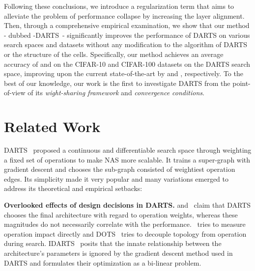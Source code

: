 \documentclass{article} \usepackage{fancyhdr, iclr2023_conference, times}
\newcommand{\mydarts}{-DARTS\xspace}
\newcommand{\lambdafn}{layer alignment\xspace}
\begin{document}
\par Following these conclusions, we introduce a regularization term that aims to alleviate the problem of performance collapse by increasing the \lambdafn. 
Then, through a comprehensive empirical examination, we show that our method - dubbed \mydarts~- significantly improves the performance of DARTS on various search spaces and datasets without any modification to the algorithm of DARTS or the structure of the cells. Specifically, our method achieves an average accuracy of  and  on the CIFAR-10 and CIFAR-100 datasets on the DARTS search space, improving upon the current state-of-the-art by  and , respectively. To the best of our knowledge, our work is the first to investigate DARTS from the point-of-view of its \textit{wight-sharing framework} and \textit{convergence conditions}.


\section{Related Work}
DARTS~\citep{DBLP:conf/iclr/LiuSY19} proposed a continuous and differentiable search space through weighting a fixed set of operations to make NAS more scalable. It trains a super-graph with gradient descent and chooses the sub-graph consisted of weightiest operation edges. Its simplicity made it very popular and many variations emerged to address its theoretical and empirical setbacks:

\textbf{Overlooked effects of design decisions in DARTS.}
\citep{DBLP:conf/iclr/WangCCTH21} and~\citep{DBLP:conf/cvpr/GuW0YWLC21} claim that DARTS chooses the final architecture with regard to operation weights, whereas these magnitudes do not necessarily correlate with the performance.~\citep{DBLP:conf/iclr/WangCCTH21} tries to measure operation impact directly and DOTS~\citep{DBLP:conf/cvpr/GuW0YWLC21} tries to decouple topology from operation during search. IDARTS~\citep{DBLP:conf/iccv/XueW0WGD21} posits that the innate relationship between the architecture’s parameters is ignored by the gradient descent method used in DARTS and formulates their optimization as a bi-linear problem.
\end{document}
